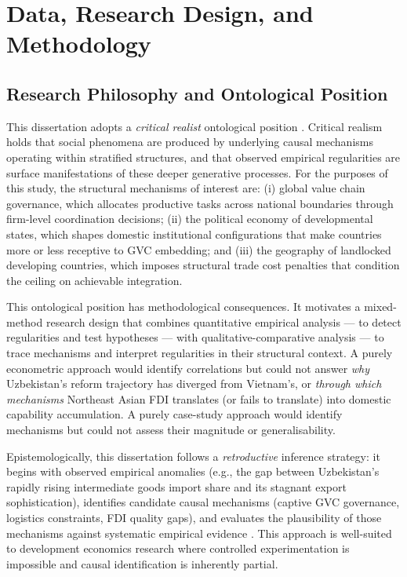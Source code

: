 \section{Data, Research Design, and Methodology}
\label{sec:methodology}

\subsection{Research Philosophy and Ontological Position}

This dissertation adopts a \textit{critical realist} ontological position \citep{bhaskar1975}. Critical realism holds that social phenomena are produced by underlying causal mechanisms operating within stratified structures, and that observed empirical regularities are surface manifestations of these deeper generative processes. For the purposes of this study, the structural mechanisms of interest are: (i) global value chain governance, which allocates productive tasks across national boundaries through firm-level coordination decisions; (ii) the political economy of developmental states, which shapes domestic institutional configurations that make countries more or less receptive to GVC embedding; and (iii) the geography of landlocked developing countries, which imposes structural trade cost penalties that condition the ceiling on achievable integration.

This ontological position has methodological consequences. It motivates a mixed-method research design that combines quantitative empirical analysis --- to detect regularities and test hypotheses --- with qualitative-comparative analysis --- to trace mechanisms and interpret regularities in their structural context. A purely econometric approach would identify correlations but could not answer \textit{why} Uzbekistan's reform trajectory has diverged from Vietnam's, or \textit{through which mechanisms} Northeast Asian FDI translates (or fails to translate) into domestic capability accumulation. A purely case-study approach would identify mechanisms but could not assess their magnitude or generalisability.

Epistemologically, this dissertation follows a \textit{retroductive} inference strategy: it begins with observed empirical anomalies (e.g., the gap between Uzbekistan's rapidly rising intermediate goods import share and its stagnant export sophistication), identifies candidate causal mechanisms (captive GVC governance, logistics constraints, FDI quality gaps), and evaluates the plausibility of those mechanisms against systematic empirical evidence \citep{danermark2019}. This approach is well-suited to development economics research where controlled experimentation is impossible and causal identification is inherently partial.

